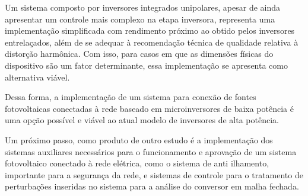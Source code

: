 \documentclass[
	12pt,				%
	openany,
	onseside,
	a4paper,			%
	english,			%
	french,				%
	spanish,			%
	brazil,				%
	]{abntex2}
\begin{document}
Um sistema composto por inversores integrados unipolares, apesar de ainda apresentar um controle mais complexo na etapa inversora, representa uma implementação simplificada com rendimento próximo ao obtido pelos inversores entrelaçados, além de se adequar à recomendação técnica de qualidade relativa à distorção harmônica. Com isso, para casos em que as dimensões físicas do dispositivo são um fator determinante, essa implementação se apresenta como alternativa viável.

Dessa forma, a implementação de um sistema para conexão de fontes fotovoltaicas conectadas à rede baseado em microinversores de baixa potência é uma opção possível e viável ao atual modelo de inversores de alta potência. 

Um próximo passo, como produto de outro estudo é a implementação dos sistemas auxiliares necessários para o funcionamento e aprovação de um sistema fotovoltaico conectado à rede elétrica, como o sistema de anti ilhamento, importante para a segurança da rede, e sistemas de controle para o tratamento de perturbações inseridas no sistema para a análise do conversor em malha fechada.
% 

\postextual








\end{document}
